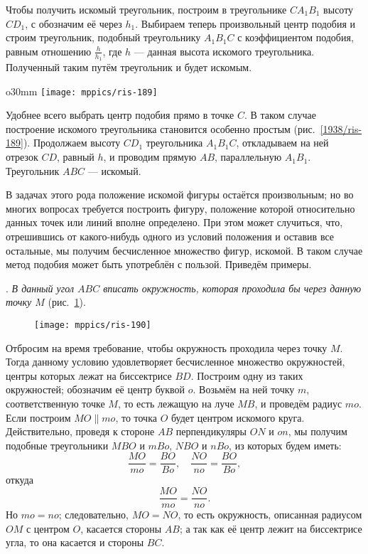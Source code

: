 Чтобы получить искомый треугольник, построим в треугольнике $CA_1B_1$ высоту $CD_1$, с обозначим её через $h_1$.
Выбираем теперь произвольный центр подобия и строим треугольник, подобный треугольнику $A_1B_1C$ с коэффициентом подобия, равным отношению $\tfrac{h}{h_1}$,
где $h$ — данная высота искомого треугольника.
Полученный таким путём треугольник и будет искомым.

\begin{wrapfigure}{o}{30mm}
\centering
\texttt{[image: mppics/ris-189]}
\caption{}\label{1938/ris-189}
\end{wrapfigure}

Удобнее всего выбрать центр подобия прямо в точке $C$.
В таком случае построение искомого треугольника становится особенно простым (рис.~\ref{1938/ris-189}).
Продолжаем высоту $CD_1$ треугольника $A_1B_1C$, откладываем на ней отрезок $CD$, равный $h$, и проводим прямую $AB$, параллельную $A_1B_1$.
Треугольник $ABC$ — искомый. 

\medskip

В задачах этого рода положение искомой фигуры остаётся произвольным;
но во многих вопросах требуется построить фигуру, положение которой относительно данных точек или линий вполне определено.
При этом может случиться, что, отрешившись от какого-нибудь одного из условий положения и оставив все остальные, мы получим бесчисленное множество фигур,  искомой.
В таком случае метод подобия может быть употреблён с пользой.
Приведём примеры.

\smallskip
{}.
\emph{В данный угол $ABC$ вписать окружность, которая проходила бы через данную точку $M$} (рис.~\ref{1938/ris-190}).

\begin{figure}[h]
\centering
\texttt{[image: mppics/ris-190]}
\caption{}\label{1938/ris-190}
\end{figure}

Отбросим на время требование, чтобы окружность проходила через точку $M$.
Тогда данному условию удовлетворяет бесчисленное множество окружностей, центры которых лежат на биссектрисе $BD$.
Построим одну из таких окружностей; обозначим её центр буквой $o$. 
Возьмём на ней точку $m$, соответственную точке $M$, то есть лежащую на луче $MB$, и проведём радиус $mo$.
Если построим $MO\parallel mo$, то точка $O$ будет центром искомого круга.
Действительно, проведя к стороне $AB$ перпендикуляры $ON$ и $on$, мы получим подобные треугольники $MBO$ и $mBo$, $NBO$ и $nBo$, из которых будем иметь:
\[\frac{MO}{mo} = \frac{BO}{Bo}, \quad 
 \frac{NO}{no} = \frac{BO}{Bo},
\]
откуда 
\[\frac{MO}{mo} = \frac{NO}{no}.\]
Но $mo =no$;
следовательно, $MO=NO$, то есть окружность, описанная радиусом $OM$ с центром $O$, касается стороны $AB$;
а так как её центр лежит на биссектрисе угла, то она касается и стороны $BC$.

